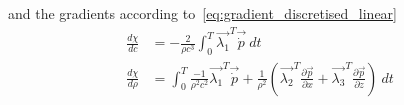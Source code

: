 \documentclass[fleqn,11pt]{SelfArx} %
\newcommand{\pder}[2][]{\frac{\partial#1}{\partial#2}}
\theoremstyle{definition}
\begin{document}
and the gradients according to~\cref{eq:gradient_discretised_linear}
\begin{equation}
\begin{aligned}
\frac{d\chi}{dc} &=-\frac{2}{\rho c^3} \int_0^T\vec{\lambda_1}^T\vec{\dot{p}} \ dt \\
\frac{d\chi}{d\rho} &= \int_0^T \frac{-1}{\rho^2 c^2} \vec{\lambda_1}^T \vec{\dot{p}} + \frac{1}{\rho^2}\left(\vec{\lambda_2}^T \pder[\vec{p}]{x} + \vec{\lambda_3}^T \pder[\vec{p}]{z}\right)\  dt\\
\end{aligned}
\end{equation}





\end{document}
